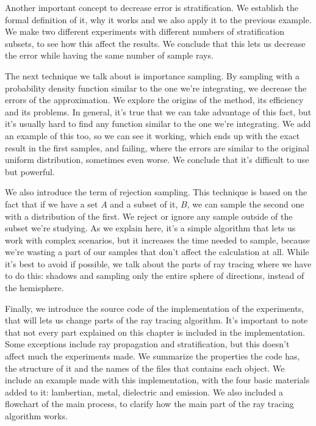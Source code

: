 \documentclass{scrbook}
\begin{document}
Another important concept to decrease error is stratification. We establish the formal definition of it, why it works and we also apply it to the previous example. We make two different experiments with different numbers of stratification subsets, to see how this affect the results. We conclude that this lets us decrease the error while having the same number of sample rays.

The next technique we talk about is importance sampling. By sampling with a probability density function similar to the one we're integrating, we decrease the errors of the approximation. We explore the origins of the method, its efficiency and its problems. In general, it's true that we can take advantage of this fact, but it's usually hard to find any function similar to the one we're integrating. We add an example of this too, so we can see it working, which ends up with the exact result in the first samples, and failing, where the errors are similar to the original uniform distribution, sometimes even worse. We conclude that it's difficult to use but powerful.

We also introduce the term of rejection sampling. This technique is based on the fact that if we have a set $A$ and a subset of it, $B$, we can sample the second one with a distribution of the first. We reject or ignore any sample outside of the subset we're studying. As we explain here, it's a simple algorithm that lets us work with complex scenarios, but it increases the time needed to sample, because we're wasting a part of our samples that don't affect the calculation at all. While it's best to avoid if possible, we talk about the parts of ray tracing where we have to do this: shadows and sampling only the entire sphere of directions, instead of the hemisphere.

Finally, we introduce the source code of the implementation of the experiments, that will lets us change parts of the ray tracing algorithm. It's important to note that not every part explained on this chapter is included in the implementation. Some exceptions include ray propagation and stratification, but this doesn't affect much the experiments made. We summarize the properties the code has, the structure of it and the names of the files that contains each object. We include an example made with this implementation, with the four basic materials added to it: lambertian, metal, dielectric and emission. We also included a flowchart of the main process, to clarify how the main part of the ray tracing algorithm works. 
\end{document}
